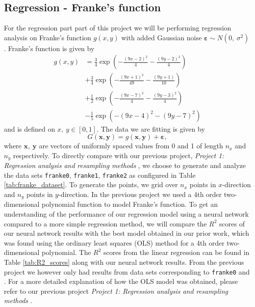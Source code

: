 \documentclass[a4paper, 11pt, twocolumn]{article}
\begin{document}
\subsection{Regression - Franke's function}
For the regression part part of this project we will be performing regression
analysis on Franke's function $g(x,y)$ with added Gaussian noise $\bm{\varepsilon}
\sim N(0,\  \sigma^2) $. Franke's function is given by
\begin{align}
g(x,y) &= \frac{3}{4}\exp{\left(-\frac{(9x-2)^2}{4}   - \frac{(9y-2)^2}{4}\right)} \nonumber\\
 &+\frac{3}{4}\exp{\left(-\frac{(9x+1)^2}{49}- \frac{(9y+1)}{10}\right)} \nonumber\\
 &+\frac{1}{2}\exp{\left(-\frac{(9x-7)^2}{4} - \frac{(9y-3)^2}{4}\right)} \nonumber\\
 &-\frac{1}{5}\exp{\left(-(9x-4)^2 - (9y-7)^2\right) }  \label{eq:Franke}
\end{align} and is defined on $x,\ y \in [0,1]$. The data we are fitting is
given by
$$G(\bm{x}, \bm{y}) = g(\bm{x}, \bm{y}) + \bm{\varepsilon},$$
where $\bm{x},\ \bm{y}$ are vectors of uniformly spaced values from 0 and 1 of
length $n_x$ and $n_y$ respectively. To directly compare with our previous
project, \textit{Project 1: Regression analysis and resampling methods}
\cite{regpaper}, we choose to generate and analyze the data sets \texttt{franke0},
\texttt{franke1}, \texttt{franke2} as configured in Table \ref{tab:franke_dataset}.
To generate the points, we grid over $n_x$ points in $x$-direction and $n_y$ points
in $y$-direction.
In the previous project we used a 4th order two-dimensional polynomial function 
to model Franke's function. To get an understanding of the performance of our 
regression model using a neural network compared to a more simple regression 
method, we will compare the $R^2$ scores of our neural network results with the 
best model obtained in our prior work, which was found using the ordinary least 
squares (OLS) method for a 4th order two-dimensional polynomial. The $R^2$ scores 
from the linear regression can be found in Table \ref{tab:R2_scores} along with 
our neural network results. From the previous project we however only had 
results from data sets corresponding to \texttt{franke0} and . 
For a more detailed explanation of how the OLS model was obtained, please refer 
to our previous project \textit{Project 1: Regression analysis and resampling
methods }\cite{regpaper}.
\end{document}
